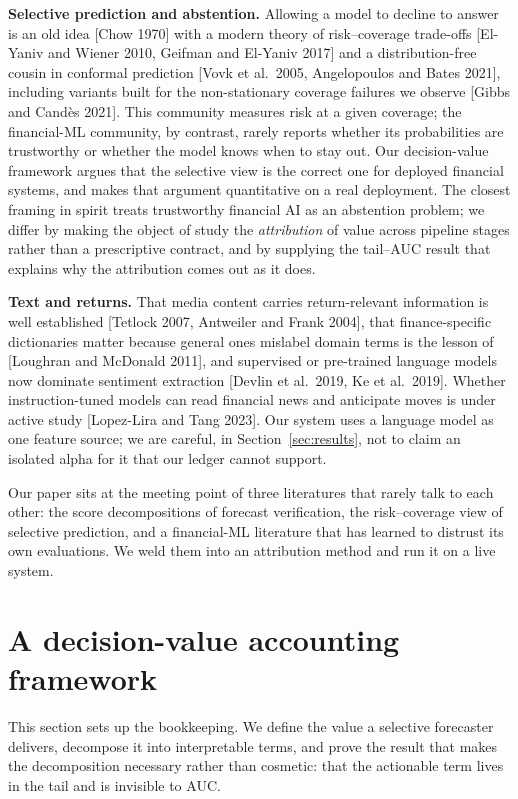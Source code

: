 \documentclass[10pt,a4paper,oneside]{article}
\theoremstyle{definition}
\theoremstyle{plain}
\begin{document}
\noindent\textbf{Selective prediction and abstention.}
Allowing a model to decline to answer is an old idea [Chow 1970] with a modern
theory of risk--coverage trade-offs [El-Yaniv and Wiener 2010, Geifman and El-Yaniv
2017] and a distribution-free cousin in conformal prediction [Vovk et al.\ 2005,
Angelopoulos and Bates 2021], including variants built for the non-stationary
coverage failures we observe [Gibbs and Cand\`es 2021]. This community measures
risk at a given coverage; the financial-ML community, by contrast, rarely reports
whether its probabilities are trustworthy or whether the model knows when to stay
out. Our decision-value framework argues that the selective
view is the correct one for deployed financial systems, and makes that argument
quantitative on a real deployment. The closest framing in spirit treats trustworthy financial AI as an
abstention problem; we differ by making the object of study the \emph{attribution}
of value across pipeline stages rather than a prescriptive contract, and by
supplying the tail--AUC result that explains why the attribution comes out as it
does.

\noindent\textbf{Text and returns.}
That media content carries return-relevant information is well established
[Tetlock 2007, Antweiler and Frank 2004], that finance-specific dictionaries matter
because general ones mislabel domain terms is the lesson of [Loughran and McDonald
2011], and supervised or pre-trained language models now dominate sentiment
extraction [Devlin et al.\ 2019, Ke et al.\ 2019]. Whether instruction-tuned models
can read financial news and anticipate moves is under active study [Lopez-Lira and
Tang 2023]. Our system uses a language model as one feature source; we are careful,
in Section~\ref{sec:results}, not to claim an isolated alpha for it that our ledger
cannot support.

Our paper sits at the meeting point of three literatures that rarely talk to each
other: the score decompositions of forecast verification, the risk--coverage view
of selective prediction, and a financial-ML literature that has learned to distrust
its own evaluations. We weld them into an attribution method and run it on a live
system.

\section{A decision-value accounting framework}
\label{sec:framework}
This section sets up the bookkeeping. We define the value a selective forecaster
delivers, decompose it into interpretable terms, and prove the result that makes the
decomposition necessary rather than cosmetic: that the actionable term lives in the
tail and is invisible to AUC.
\end{document}
